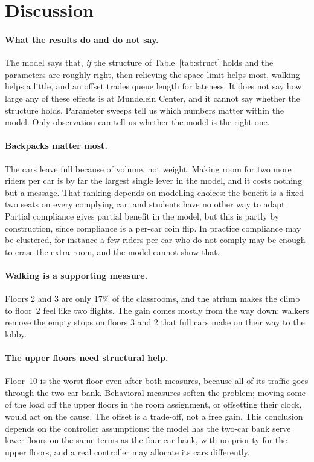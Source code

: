 \section{Discussion}

\paragraph{What the results do and do not say.} The model says that, \emph{if} the structure of
Table~\ref{tab:struct} holds and the parameters are roughly right, then relieving the space limit helps most,
walking helps a little, and an offset trades queue length for lateness. It does not say how large any of these effects
is at Mundelein Center, and it cannot say whether the structure holds. Parameter sweeps tell us which numbers
matter within the model. Only observation can tell us whether the model is the right one.

\paragraph{Backpacks matter most.} The cars leave full because of volume, not weight. Making room for two more
riders per car is by far the largest single lever in the model, and it costs nothing but a message. That ranking
depends on modelling choices: the benefit is a fixed two seats on every complying car, and students have no other
way to adapt. Partial compliance gives partial benefit in the
model, but this is partly by construction, since compliance is a per-car coin flip. In practice compliance may be
clustered, for instance a few riders per car who do not comply may be enough to erase the extra room, and the model
cannot show that.

\paragraph{Walking is a supporting measure.} Floors 2 and 3 are only 17\% of the classrooms, and the
atrium makes the climb to floor~2 feel like two flights. The gain comes mostly from the way down: walkers
remove the empty stops on floors 3 and 2 that full cars make on their way to the lobby.

\paragraph{The upper floors need structural help.} Floor~10 is the worst floor even after both measures,
because all of its traffic goes through the two-car bank. Behavioral measures soften the problem; moving some of
the load off the upper floors in the room assignment, or offsetting their clock, would act on the cause.
The offset is a trade-off, not a free gain. This conclusion depends on the controller assumptions: the model has
the two-car bank serve lower floors on the same terms as the four-car bank, with no priority for the upper floors,
and a real controller may allocate its cars differently.
